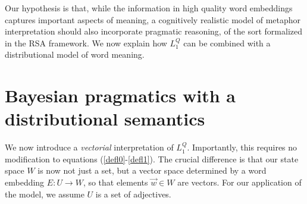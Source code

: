 \documentclass[9pt,twocolumn,twoside,lineno]{pnas-new}
\newcommand{\Listener}{L}
\newcommand{\QLONE}{\Listener_{{1}}^{{Q}}}
\begin{document}
	Our hypothesis is that, while the information in high quality word embeddings captures important aspects of meaning, a cognitively realistic model of metaphor interpretation should also incorporate pragmatic reasoning, of the sort formalized in the RSA framework. We now explain how $\QLONE$ can be combined with a distributional model of word meaning.

	\section{Bayesian pragmatics with a distributional semantics} \label{bayesdist}


	We now introduce a \emph{vectorial} interpretation of $\QLONE$. Importantly, this requires no modification to equations (\ref{defl0}-\ref{defl1}). The crucial difference is that our state space $W$ is now not just a set, but a vector space determined by a word embedding $E : U\to W$, so that elements $\overrightarrow{w}\in W$ are vectors.
	For our application of the model, we assume $U$ is a set of adjectives. 

		


	
\end{document}
